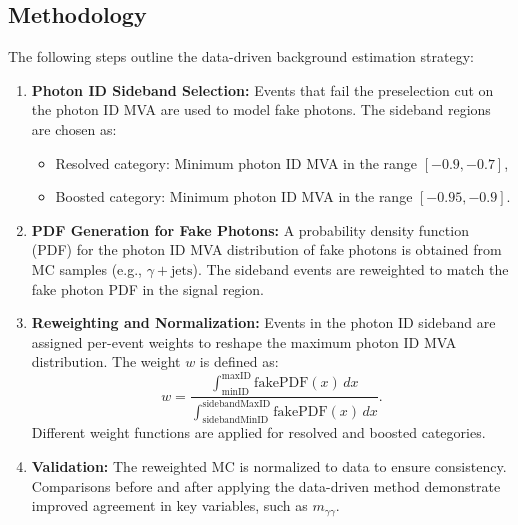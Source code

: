 \subsection{Methodology}
The following steps outline the data-driven background estimation strategy:

\begin{enumerate}
    \item \textbf{Photon ID Sideband Selection:}
    Events that fail the preselection cut on the photon ID MVA are used to model fake photons. The sideband regions are chosen as:
    \begin{itemize}
        \item Resolved category: Minimum photon ID MVA in the range \([-0.9, -0.7]\),
        \item Boosted category: Minimum photon ID MVA in the range \([-0.95, -0.9]\).
    \end{itemize}

    \item \textbf{PDF Generation for Fake Photons:}
    A probability density function (PDF) for the photon ID MVA distribution of fake photons is obtained from MC samples (e.g.,
    \(\gamma + \text{jets}\)). The sideband events are reweighted to match the fake photon PDF in the signal region.

    \item \textbf{Reweighting and Normalization:}
    Events in the photon ID sideband are assigned per-event weights to reshape the maximum photon ID MVA distribution. The weight
     \(w\) is defined as:
    \begin{equation}
        w = \frac{\int_{\text{minID}}^{\text{maxID}} \text{fakePDF}(x) \, dx}
                 {\int_{\text{sidebandMinID}}^{\text{sidebandMaxID}} \text{fakePDF}(x) \, dx}.
    \end{equation}
    Different weight functions are applied for resolved and boosted categories.

    \item \textbf{Validation:}
    The reweighted MC is normalized to data to ensure consistency. Comparisons before and after applying the data-driven method demonstrate improved agreement in key variables, such as \(m_{\gamma\gamma}\).
\end{enumerate}

